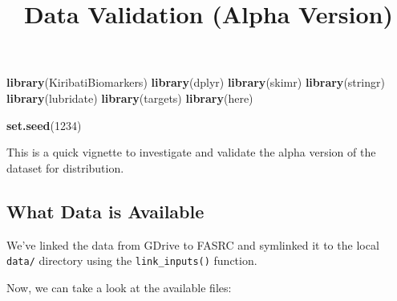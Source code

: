 \documentclass[]{article}
\title{Data Validation (Alpha Version)}
\author{}
\date{\vspace{-2.5em}}
\newenvironment{Shaded}{\begin{snugshade}}{\end{snugshade}}
\newcommand{\DecValTok}[1]{\textcolor[rgb]{0.00,0.00,0.81}{#1}}
\newcommand{\KeywordTok}[1]{\textcolor[rgb]{0.13,0.29,0.53}{\textbf{#1}}}
\newcommand{\NormalTok}[1]{#1}
\begin{document}
\maketitle

\begin{Shaded}
\begin{Highlighting}[]
\KeywordTok{library}\NormalTok{(KiribatiBiomarkers)}
\KeywordTok{library}\NormalTok{(dplyr)}
\KeywordTok{library}\NormalTok{(skimr)}
\KeywordTok{library}\NormalTok{(stringr)}
\KeywordTok{library}\NormalTok{(lubridate)}
\KeywordTok{library}\NormalTok{(targets)}
\KeywordTok{library}\NormalTok{(here)}

\KeywordTok{set.seed}\NormalTok{(}\DecValTok{1234}\NormalTok{)}
\end{Highlighting}
\end{Shaded}

This is a quick vignette to investigate and validate the alpha version
of the dataset for distribution.

\hypertarget{what-data-is-available}{%
\subsection{What Data is Available}\label{what-data-is-available}}

We've linked the data from GDrive to FASRC and symlinked it to the local
\texttt{data/} directory using the \texttt{link\_inputs()} function.

Now, we can take a look at the available files:
\end{document}
